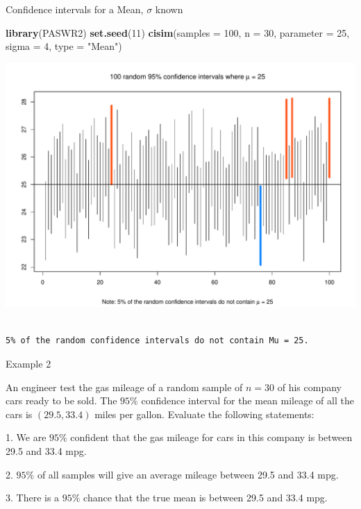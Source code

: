 \documentclass[
  ignorenonframetext,
]{beamer}
\newenvironment{Shaded}{\begin{snugshade}}{\end{snugshade}}
\newcommand{\AttributeTok}[1]{\textcolor[rgb]{0.13,0.29,0.53}{#1}}
\newcommand{\DecValTok}[1]{\textcolor[rgb]{0.00,0.00,0.81}{#1}}
\newcommand{\FunctionTok}[1]{\textcolor[rgb]{0.13,0.29,0.53}{\textbf{#1}}}
\newcommand{\NormalTok}[1]{#1}
\newcommand{\StringTok}[1]{\textcolor[rgb]{0.31,0.60,0.02}{#1}}
\begin{document}
\begin{frame}[fragile]{Confidence intervals for a Mean, \(\sigma\)
known}
\protect\hypertarget{confidence-intervals-for-a-mean-sigma-known-7}{}
\tiny

\begin{Shaded}
\begin{Highlighting}[]
\FunctionTok{library}\NormalTok{(PASWR2)}
\FunctionTok{set.seed}\NormalTok{(}\DecValTok{11}\NormalTok{)}
\FunctionTok{cisim}\NormalTok{(}\AttributeTok{samples =} \DecValTok{100}\NormalTok{, }\AttributeTok{n =} \DecValTok{30}\NormalTok{, }\AttributeTok{parameter =} \DecValTok{25}\NormalTok{, }\AttributeTok{sigma =} \DecValTok{4}\NormalTok{, }\AttributeTok{type =} \StringTok{"Mean"}\NormalTok{)}
\end{Highlighting}
\end{Shaded}

\begin{center}\includegraphics[width=0.6\linewidth,height=0.4\textheight]{Week10_Lect_files/figure-beamer/unnamed-chunk-48-1} \end{center}

\begin{verbatim}

5% of the random confidence intervals do not contain Mu = 25.
\end{verbatim}

\normalsize
\end{frame}

\begin{frame}{Example 2}
\protect\hypertarget{example-2}{}
\begin{tcolorbox}
An engineer test the gas mileage of a random sample of $n=30$ of his company cars ready to be sold. The $95\%$ confidence interval for the mean mileage of all the cars is $(29.5, 33.4)$ miles per gallon. Evaluate the following statements:

1. We are $95\%$ confident that the gas mileage for cars in this company is between 29.5 and 33.4 mpg.

2. $95\%$ of all samples will give an average mileage between 29.5 and 33.4 mpg.

3. There is a $95\%$ chance that the true mean is between 29.5 and 33.4 mpg.
\end{tcolorbox}
\end{frame}
\end{document}
